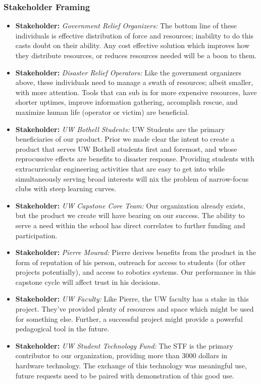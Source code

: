 \documentclass[a4paper, 10pt]{article}
\begin{document}
		
		\subsubsection{Stakeholder Framing}		
			\begin{itemize}
			\item
			\textbf{Stakeholder:} \emph{Government Relief Organizers:} The bottom line of these individuals is effective distribution of force and resources; inability to do this casts doubt on their ability. Any cost effective solution which improves how they distribute resources, or reduces resources needed will be a boon to them. 		
			
			\item
			\textbf{Stakeholder:} \emph{Disaster Relief Operators:} Like the government organizers above, these individuals need to manage a swath of resources; albeit smaller, with more attention. Tools that can sub in for more expensive resources, have shorter uptimes, improve information gathering, accomplish rescue, and maximize human life (operator or victim) are beneficial.
			
			\item
			\textbf{Stakeholder:} \emph{UW Bothell Students:} UW Students are the primary beneficiaries of our product. Prior we made clear the intent to create a product that serves UW Bothell students first and foremost, and whose reprocussive effects are benefits to disaster response. Providing students with extracurricular engineering activities that are easy to get into while simultaneously serving broad interests will nix the problem of narrow-focus clubs with steep learning curves. 
			
			\item
			\textbf{Stakeholder:} \emph{UW Capstone Core Team:} Our organization already exists, but the product we create will have bearing on our success. The ability to serve a  need within the school has direct correlates to further funding and participation.

			\item
			\textbf{Stakeholder:} \emph{Pierre Mourad:} Pierre derives benefits from the product in the form of reputation of his person, outreach for access to students (for other projects potentially), and access to robotics systems. Our performance in this capstone cycle will affect trust in his decisions.
			
			\item
			\textbf{Stakeholder:} \emph{UW Faculty:} Like Pierre, the UW faculty has a stake in this project. They've provided plenty of resources and space which might be used for something else. Further, a successful project might provide a powerful pedagogical tool in the future.

			\item
			\textbf{Stakeholder:} \emph{UW Student Technology Fund:} The STF is the primary contributor to our organization, providing more than 3000 dollars in hardware technology. The exchange of this technology was meaningful use, future requests need to be paired with demonstration of this good use.
			\end{itemize}
			
\end{document}
